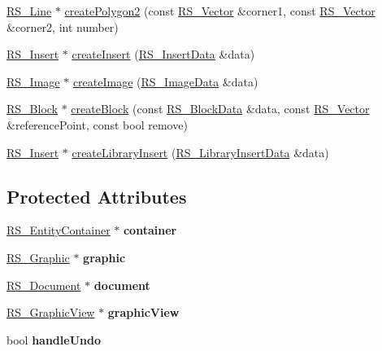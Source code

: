 \begin{DoxyCompactItemize}
\hyperlink{classRS__Line}{R\-S\-\_\-\-Line} $\ast$ \hyperlink{classRS__Creation_a0fa86baf2022e59876a0454044c510c6}{create\-Polygon2} (const \hyperlink{classRS__Vector}{R\-S\-\_\-\-Vector} \&corner1, const \hyperlink{classRS__Vector}{R\-S\-\_\-\-Vector} \&corner2, int number)
\item 
\hyperlink{classRS__Insert}{R\-S\-\_\-\-Insert} $\ast$ \hyperlink{classRS__Creation_a77c71a57182f5c358231eea5b6047696}{create\-Insert} (\hyperlink{classRS__InsertData}{R\-S\-\_\-\-Insert\-Data} \&data)
\item 
\hyperlink{classRS__Image}{R\-S\-\_\-\-Image} $\ast$ \hyperlink{classRS__Creation_a9afd196c29ca78661c8f29b0c940627c}{create\-Image} (\hyperlink{classRS__ImageData}{R\-S\-\_\-\-Image\-Data} \&data)
\item 
\hyperlink{classRS__Block}{R\-S\-\_\-\-Block} $\ast$ \hyperlink{classRS__Creation_a431d27aaa55028674325cab7931b6461}{create\-Block} (const \hyperlink{classRS__BlockData}{R\-S\-\_\-\-Block\-Data} \&data, const \hyperlink{classRS__Vector}{R\-S\-\_\-\-Vector} \&reference\-Point, const bool remove)
\item 
\hyperlink{classRS__Insert}{R\-S\-\_\-\-Insert} $\ast$ \hyperlink{classRS__Creation_aa4f973e0dcab1a58e8647541e5753b6f}{create\-Library\-Insert} (\hyperlink{structRS__LibraryInsertData}{R\-S\-\_\-\-Library\-Insert\-Data} \&data)
\end{DoxyCompactItemize}
\subsection*{Protected Attributes}
\begin{DoxyCompactItemize}
\item 
\hypertarget{classRS__Creation_a96a94a53061a7a02c648fe3805a1208a}{\hyperlink{classRS__EntityContainer}{R\-S\-\_\-\-Entity\-Container} $\ast$ {\bfseries container}}\label{classRS__Creation_a96a94a53061a7a02c648fe3805a1208a}

\item 
\hypertarget{classRS__Creation_a3afefc9751c643eef7cd39780b78cf36}{\hyperlink{classRS__Graphic}{R\-S\-\_\-\-Graphic} $\ast$ {\bfseries graphic}}\label{classRS__Creation_a3afefc9751c643eef7cd39780b78cf36}

\item 
\hypertarget{classRS__Creation_a02e23c8f2c691e5bf8304591af502ee5}{\hyperlink{classRS__Document}{R\-S\-\_\-\-Document} $\ast$ {\bfseries document}}\label{classRS__Creation_a02e23c8f2c691e5bf8304591af502ee5}

\item 
\hypertarget{classRS__Creation_a0bd4baea331ebc59a653185b931deab5}{\hyperlink{classRS__GraphicView}{R\-S\-\_\-\-Graphic\-View} $\ast$ {\bfseries graphic\-View}}\label{classRS__Creation_a0bd4baea331ebc59a653185b931deab5}

\item 
\hypertarget{classRS__Creation_a511da1ee17f0580a7f6b3f522b59c988}{bool {\bfseries handle\-Undo}}\label{classRS__Creation_a511da1ee17f0580a7f6b3f522b59c988}

\end{DoxyCompactItemize}



